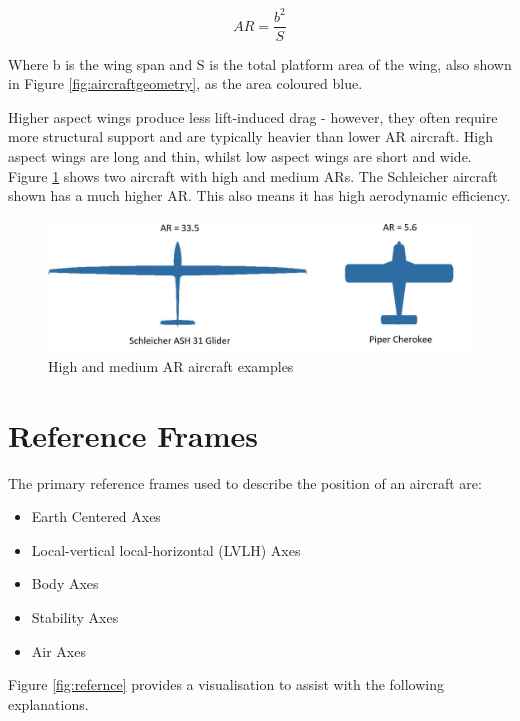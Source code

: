 \begin{equation}
    AR = \frac{b^2}{S}
    \label{eqn:Aspect}
\end{equation}

 Where \acrshort{b} is the wing span and \acrshort{S} is the total platform area of the wing, also shown in Figure \ref{fig:aircraftgeometry}, as the area coloured blue. 

Higher aspect wings produce less lift-induced drag - however, they often require more structural support and are typically heavier than lower \acrshort{AR} aircraft. High aspect wings are long and thin, whilst low aspect wings are short and wide. Figure \ref{fig:AR} shows two aircraft with high and medium \acrshort{AR}s. The Schleicher aircraft shown has a much higher \acrshort{AR}. This also means it has high aerodynamic efficiency. 



\begin{figure}[H]
  \centering
  \includegraphics[width=1\linewidth]{03_LiteratureReview/Figs/AspectRatio.JPG}
  \caption{High and medium \acrshort{AR} aircraft examples \cite{gliderImages}}
  \label{fig:AR}
\end{figure}

\section{Reference Frames}
The primary reference frames used to describe the position of an aircraft are:
\begin{itemize}
    \item Earth Centered Axes
    \item Local-vertical local-horizontal (\acrshort{LVLH}) Axes
    \item Body Axes
    \item Stability Axes
    \item Air Axes
\end{itemize}

Figure \ref{fig:refernce} provides a visualisation to assist with the following explanations.


